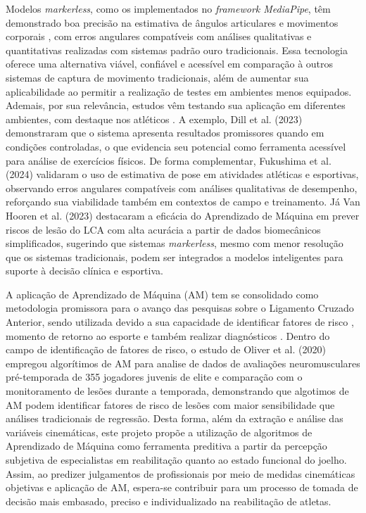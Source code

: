 \documentclass{article}
\begin{document}
Modelos \textit{markerless}, como os implementados no \textit{framework \textit{MediaPipe}}, têm demonstrado boa precisão na estimativa de ângulos articulares e movimentos corporais \cite{Dill2023, VanHooren2023, Fukushima2024}, com erros angulares compatíveis com análises qualitativas e quantitativas realizadas com sistemas padrão ouro tradicionais. Essa tecnologia oferece uma alternativa viável, confiável e acessível em comparação à outros sistemas de captura de movimento tradicionais, além de aumentar sua aplicabilidade ao permitir a realização de testes em ambientes menos equipados. Ademais, por sua relevância, estudos vêm testando sua aplicação em diferentes ambientes, com destaque nos atléticos \cite{Dill2023, VanHooren2023, Fukushima2024}.  A exemplo, Dill et al. (2023) \cite{Dill2023} demonstraram que o sistema apresenta resultados promissores quando em condições controladas, o que evidencia seu potencial como ferramenta acessível para análise de exercícios físicos. De forma complementar, Fukushima et al. (2024) \cite{Fukushima2024} validaram o uso de estimativa de pose em atividades atléticas e esportivas, observando erros angulares compatíveis com análises qualitativas de desempenho, reforçando sua viabilidade também em contextos de campo e treinamento. Já Van Hooren et al. (2023) \cite{VanHooren2023} destacaram a eficácia do Aprendizado de Máquina em prever riscos de lesão do LCA com alta acurácia a partir de dados biomecânicos simplificados, sugerindo que sistemas \textit{markerless}, mesmo com menor resolução que os sistemas tradicionais, podem ser integrados a modelos inteligentes para suporte à decisão clínica e esportiva. 

A aplicação de Aprendizado de Máquina (AM) tem se consolidado como metodologia promissora para o avanço das pesquisas sobre o Ligamento Cruzado Anterior, sendo utilizada devido a sua capacidade de identificar  fatores de risco \cite{oliver2020using}, momento de retorno ao esporte \cite{hwang2024machine} e também realizar diagnósticos \cite{lao2019diagnostic}. Dentro do campo de identificação de fatores de risco, o estudo de Oliver et al. (2020) \cite{oliver2020using} empregou algorítimos de AM para analise de dados de avaliações neuromusculares pré-temporada de 355 jogadores juvenis de elite e comparação com o monitoramento de lesões durante a temporada, demonstrando que algotimos de AM podem identificar fatores de risco de lesões com maior sensibilidade que análises tradicionais de regressão.  Desta forma, além da extração e análise das variáveis cinemáticas, este projeto propõe a utilização de algoritmos de Aprendizado de Máquina como ferramenta preditiva a partir da percepção subjetiva de especialistas em reabilitação quanto ao estado funcional do joelho. Assim, ao predizer julgamentos de profissionais por meio de medidas cinemáticas objetivas e aplicação de AM, espera-se contribuir para um processo de tomada de decisão mais embasado, preciso e individualizado na reabilitação de atletas.
\end{document}
